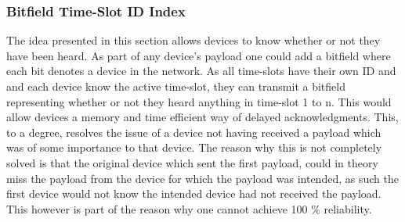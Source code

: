 \subsubsection*{Bitfield Time-Slot ID Index}
The idea presented in this section allows devices to know whether or not they have been heard.
As part of any device's payload one could add a bitfield where each bit denotes a device in the network.
As all time-slots have their own ID and and each device know the active time-slot, they can transmit a bitfield representing whether or not they heard anything in time-slot 1 to n.
This would allow devices a memory and time efficient way of delayed acknowledgments.
This, to a degree, resolves the issue of a device not having received a payload which was of some importance to that device.
The reason why this is not completely solved is that the original device which sent the first payload, could in theory miss the payload from the device for which the payload was intended, as such the first device would not know the intended device had not received the payload.
This however is part of the reason why one cannot achieve 100 \% reliability.
